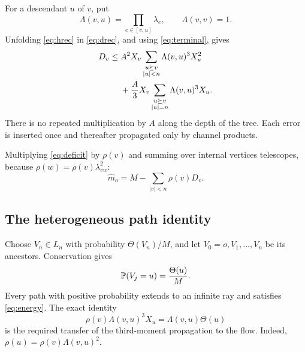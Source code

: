 For a descendant $u$ of $v$, put
\[
\Lambda(v,u)=\prod_{e\in[v,u]}\lambda_e,
\qquad\Lambda(v,v)=1.
\]
Unfolding \eqref{eq:hrec} in \eqref{eq:drec}, and using
\eqref{eq:terminal}, gives
\begin{align}
D_v\le{}& A^2X_v
\sum_{\substack{u\succeq v\\|u|<n}}\Lambda(v,u)^3X_u^2
\notag\\
&+\frac A3X_v\sum_{\substack{u\succeq v\\|u|=n}}
\Lambda(v,u)^3X_u.
\label{eq:unfold}
\end{align}
There is no repeated multiplication by $A$ along the depth of the tree.
Each error is inserted once and thereafter propagated only by channel
products.

Multiplying \eqref{eq:deficit} by $\rho(v)$ and summing over internal
vertices telescopes, because $\rho(w)=\rho(v)\lambda_{vw}^2$:
\begin{equation}\label{eq:telescope}
\widehat m_o=M-\sum_{|v|<n}\rho(v)D_v.
\end{equation}

\subsection{The heterogeneous path identity}

Choose $V_n\in L_n$ with probability $\Theta(V_n)/M$, and let
$V_0=o,V_1,\ldots,V_n$ be its ancestors. Conservation gives
\begin{equation}\label{eq:pathlaw}
\mathbb P(V_j=u)=\frac{\Theta(u)}M.
\end{equation}
Every path with positive probability extends to an infinite ray and
satisfies \eqref{eq:energy}. The exact identity
\begin{equation}\label{eq:keyidentity}
\boxed{\quad \rho(v)\Lambda(v,u)^3X_u
=\Lambda(v,u)\Theta(u)\quad}
\end{equation}
is the required transfer of the third-moment propagation to the flow.
Indeed, $\rho(u)=\rho(v)\Lambda(v,u)^2$.

